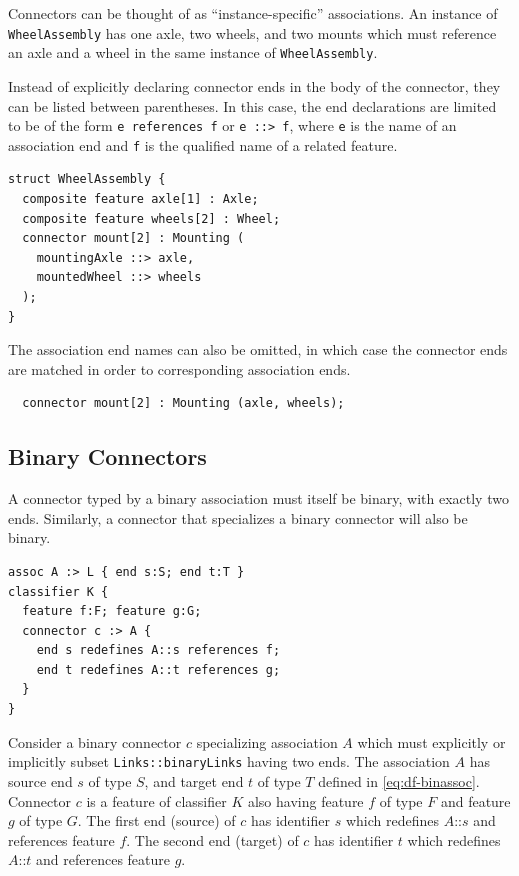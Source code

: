 \pn Connectors can be thought of as ``instance-specific'' associations.  An instance of \texttt{WheelAssembly} has one axle, two wheels, and two mounts which must reference an axle and a wheel in the same instance of \texttt{WheelAssembly}. 

\pn Instead of explicitly declaring connector ends in the body of the connector, they can be listed between parentheses. In this case, the end
declarations are limited to be of the form \texttt{e references f} or \texttt{e ::> f}, where \texttt{e} is the name of an association end
and \texttt{f} is the qualified name of a related feature.

\begin{lstlisting}
struct WheelAssembly {
  composite feature axle[1] : Axle;
  composite feature wheels[2] : Wheel;
  connector mount[2] : Mounting (
    mountingAxle ::> axle,
    mountedWheel ::> wheels
  );
}
\end{lstlisting}

\pn The association end names can also be omitted, in which case the connector ends are matched in order to
corresponding association ends.

\begin{lstlisting}
  connector mount[2] : Mounting (axle, wheels);
\end{lstlisting}


\subsection{Binary Connectors}

\pn A connector typed by a binary association must itself be binary, with exactly two ends.  Similarly, a connector that specializes a binary connector will also be binary.  

\begin{lstlisting}
assoc A :> L { end s:S; end t:T }
classifier K {
  feature f:F; feature g:G;
  connector c :> A {
    end s redefines A::s references f;
    end t redefines A::t references g;
  }
}
\end{lstlisting}

\pn Consider a binary connector $c$ specializing association $A$ which must explicitly or implicitly subset \texttt{Links::bi\-naryLinks} having two ends.
The association $A$ has source end $s$ of type $S$, and target end $t$ of type $T$ defined in \ref{eq:df-binassoc}.
Connector $c$ is a feature of classifier $K$ also having feature $f$ of type $F$ and feature $g$ of type $G$.
The first end (source) of $c$ has identifier $s$ which redefines $A$::$s$ and references feature $f$.  The second end (target) of $c$ has identifier $t$ which redefines $A$::$t$ and references feature $g$.  


